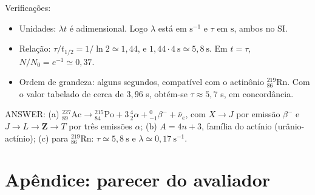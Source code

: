 \documentclass{article}%
\begin{document}
Verificações:
\begin{itemize}
\item Unidades: $\lambda t$ é adimensional. Logo $\lambda$ está em $\mathrm{s}^{-1}$ e $\tau$ em $\mathrm{s}$, ambos no SI.
\item Relação: $\tau/t_{1/2}=1/\ln 2\simeq 1{,}44$, e $1{,}44\cdot 4\ \mathrm{s}\simeq 5{,}8\ \mathrm{s}$. Em $t=\tau$, $N/N_0=e^{-1}\simeq 0{,}37$.
\item Ordem de grandeza: alguns segundos, compatível com o actinônio ${}^{219}_{86}\mathrm{Rn}$. Com o valor tabelado de cerca de $3{,}96$ s, obtém-se $\tau\approx 5{,}7$ s, em concordância.
\end{itemize}

ANSWER: (a) ${}^{227}_{89}\mathrm{Ac}\to{}^{215}_{84}\mathrm{Po}+3\,{}^{4}_{2}\alpha+{}^{0}_{-1}\beta^-+\bar{\nu}_e$, com $X\to J$ por emissão $\beta^-$ e $J\to L\to\mathbf{Z}\to T$ por três emissões $\alpha$; (b) $A=4n+3$, família do actínio (urânio-actínio); (c) para ${}^{219}_{86}\mathrm{Rn}$: $\tau\simeq 5{,}8\ \mathrm{s}$ e $\lambda\simeq 0{,}17\ \mathrm{s}^{-1}$.%
\newpage%
\section*{Apêndice: parecer do avaliador}%
\end{document}
